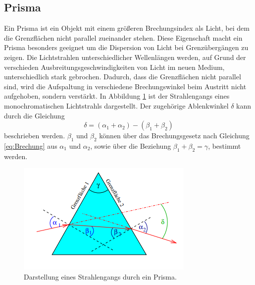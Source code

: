 \subsection{Prisma}
Ein Prisma ist ein Objekt mit einem größeren Brechungsindex als Licht, bei dem die Grenzflächen
nicht parallel zueinander stehen. Diese Eigenschaft macht ein Prisma besonders geeignet um die Dispersion von Licht bei
Grenzübergängen zu zeigen. Die Lichtstrahlen unterschiedlicher Wellenlängen werden, auf Grund der verschieden Ausbreitungsgeschwindigkeiten
von Licht im neuen Medium, unterschiedlich stark gebrochen. Dadurch, dass die Grenzflächen nicht parallel sind, wird die Aufspaltung in verschiedene Brechungswinkel
beim Austritt nicht aufgehoben, sondern verstärkt. In Abbildung \ref{fig:Prisma} ist der Strahlengangs eines 
monochromatischen Lichtstrahls dargestellt. Der zugehörige Ablenkwinkel $\delta$ kann
durch die Gleichung
\begin{equation}
    \delta=(\alpha_1+\alpha_2)-(\beta_1+\beta_2)
    \label{eq:Prisma}
\end{equation}
beschrieben werden. $\beta_1$ und $\beta_2$ können über das Brechungsgesetz nach Gleichung \eqref{eq:Brechung} aus $\alpha_1$
und $\alpha_2$, sowie über die Beziehung $\beta_1+\beta_2=\gamma$, bestimmt werden.
\begin{figure}[H]
    \centering
    \includegraphics{content/Prisma.png}
    \caption{Darstellung eines Strahlengangs durch ein Prisma\cite{V400}.}
    \label{fig:Prisma}
\end{figure}
